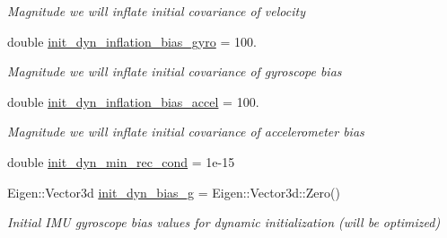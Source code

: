 \begin{DoxyCompactItemize}
\begin{DoxyCompactList}\small\item\em Magnitude we will inflate initial covariance of velocity \end{DoxyCompactList}\item 
\mbox{\label{structov__init_1_1InertialInitializerOptions_a185fc9aa3073561ac95e3bf9d421e083}} 
double \hyperlink{structov__init_1_1InertialInitializerOptions_a185fc9aa3073561ac95e3bf9d421e083}{init\+\_\+dyn\+\_\+inflation\+\_\+bias\+\_\+gyro} = 100.
\begin{DoxyCompactList}\small\item\em Magnitude we will inflate initial covariance of gyroscope bias \end{DoxyCompactList}\item 
\mbox{\label{structov__init_1_1InertialInitializerOptions_a4a3e85e21af048ba7922a97098c3f7ab}} 
double \hyperlink{structov__init_1_1InertialInitializerOptions_a4a3e85e21af048ba7922a97098c3f7ab}{init\+\_\+dyn\+\_\+inflation\+\_\+bias\+\_\+accel} = 100.
\begin{DoxyCompactList}\small\item\em Magnitude we will inflate initial covariance of accelerometer bias \end{DoxyCompactList}\item 
double \hyperlink{structov__init_1_1InertialInitializerOptions_a202ca41d108ae2da322f246f246d0c2a}{init\+\_\+dyn\+\_\+min\+\_\+rec\+\_\+cond} = 1e-\/15
\item 
\mbox{\label{structov__init_1_1InertialInitializerOptions_ac89f312b0f4ed57a1d7b97ca319b6ee6}} 
Eigen\+::\+Vector3d \hyperlink{structov__init_1_1InertialInitializerOptions_ac89f312b0f4ed57a1d7b97ca319b6ee6}{init\+\_\+dyn\+\_\+bias\+\_\+g} = Eigen\+::\+Vector3d\+::\+Zero()
\begin{DoxyCompactList}\small\item\em Initial I\+MU gyroscope bias values for dynamic initialization (will be optimized) \end{DoxyCompactList}\item 
\mbox{\label{structov__init_1_1InertialInitializerOptions_ab810afe7877d06a6154fa4f28d23051d}} 

\end{DoxyCompactItemize}
